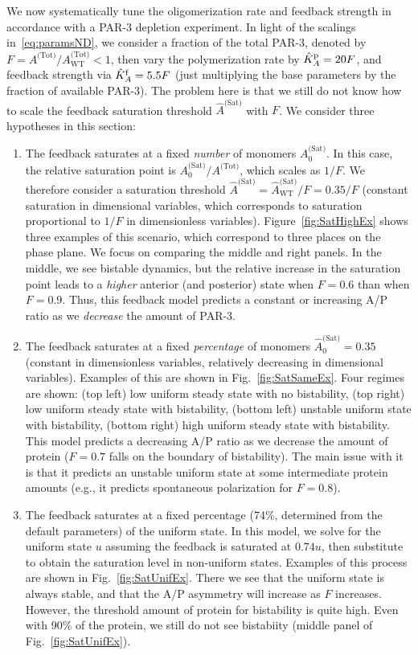 \documentclass[11pt]{article}
\newcommand{\6}[1]{#1_{\text{6}}}
\newcommand{\3}[1]{#1_{\text{3}}}
\newcommand{\Tot}[1]{#1^\text{(Tot)}}
\newcommand{\Sat}[1]{#1^\text{(Sat)}}
\begin{document}
We now systematically tune the oligomerization rate and feedback strength in accordance with a PAR-3 depletion experiment. In light of the scalings in\ \eqref{eq:paramsND}, we consider a fraction of the total PAR-3, denoted by $F=\Tot{A}/\Tot{A}_\text{WT} < 1$, then vary the polymerization rate by $\hat{K}^\text{p}_A=20F$, and feedback strength via $\hat{K}^\text{f}_A=5.5F$ (just multiplying the base parameters by the fraction of available PAR-3). The problem here is that we still do not know how to scale the feedback saturation threshold $\Sat{\hat A}$ with $F$. We consider three hypotheses in this section:
\begin{enumerate}
\item The feedback saturates at a fixed \emph{number} of monomers $\Sat{A}_0$. In this case, the relative saturation point is $\Sat{A}_0/\Tot{A}$, which scales as $1/F$. We therefore consider a saturation threshold $\Sat{\hat A}=\Sat{\hat A}_\text{WT}/F=0.35/F$ (constant saturation in dimensional variables, which corresponds to saturation proportional to $1/F$ in dimensionless variables). Figure\ \ref{fig:SatHighEx} shows three examples of this scenario, which correspond to three places on the phase plane. We focus on comparing the middle and right panels. In the middle, we see bistable dynamics, but the relative increase in the saturation point leads to a \emph{higher} anterior (and posterior) state when $F=0.6$ than when $F=0.9$. Thus, this feedback model predicts a constant or increasing A/P ratio as we \emph{decrease} the amount of PAR-3. 
\item The feedback saturates at a fixed \emph{percentage} of monomers $\Sat{\hat A}_0=0.35$ (constant in dimensionless variables, relatively decreasing in dimensional variables). Examples of this are shown in Fig.\ \ref{fig:SatSameEx}. Four regimes are shown: (top left) low uniform steady state with no bistability, (top right) low uniform steady state with bistability, (bottom left) unstable uniform state with bistability, (bottom right) high uniform steady state with bistability. This model predicts a decreasing A/P ratio as we decrease the amount of protein ($F=0.7$ falls on the boundary of bistability). The main issue with it is that it predicts an unstable uniform state at some intermediate protein amounts (e.g., it predicts spontaneous polarization for $F=0.8$).
\item The feedback saturates at a fixed percentage (74\%, determined from the default parameters) of the uniform state. In this model, we solve for the uniform state $u$ assuming the feedback is saturated at $0.74u$, then substitute to obtain the saturation level in non-uniform states. Examples of this process are shown in Fig.\ \ref{fig:SatUnifEx}. There we see that the uniform state is always stable, and that the A/P asymmetry will increase as $F$ increases. However, the threshold amount of protein for bistability is quite high. Even with 90\% of the protein, we still do not see bistabiity (middle panel of Fig.\ \ref{fig:SatUnifEx}). 

\end{enumerate}
\end{document}
